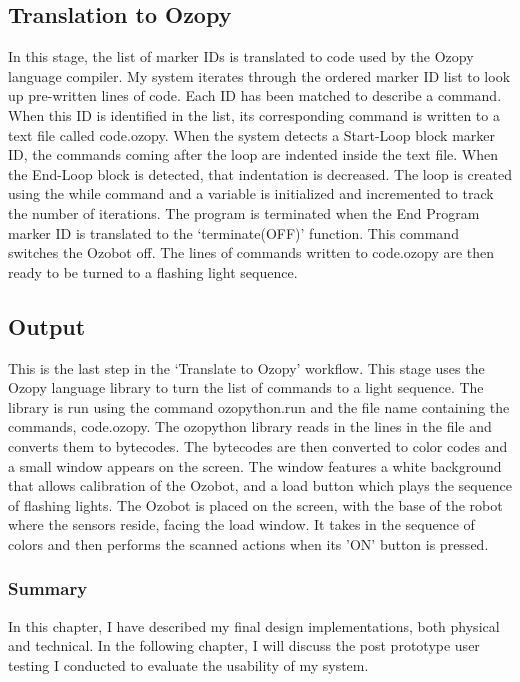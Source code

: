 \documentclass[oneside,%
                    author={Malak Hajji},
                    degree={BSc},
                    title={Designing An Accessible Ozobot Programming Platform for Students},
                  subtitle={With Mixed Visual Abilities}]{dissertation}
\begin{document}
 
\subsection{Translation to Ozopy}
 
In this stage, the list of marker IDs is translated to code used by the Ozopy language compiler. My system iterates through the ordered marker ID list to look up pre-written lines of code. Each ID has been matched to describe a command. When this ID is identified in the list, its corresponding command is written to a text file called code.ozopy.  
When the system detects a Start-Loop block marker ID, the commands coming after the loop are indented inside the text file. When the End-Loop block is detected, that indentation is decreased. The loop is created using the while command and a variable is initialized and incremented to track the number of iterations. The program is terminated when the End Program marker ID is translated to the ‘terminate(OFF)’ function. This command switches the Ozobot off. 
The lines of commands written to code.ozopy are then ready to be turned to a flashing light sequence. 
 
\subsection{Output}  
This is the last step in the ‘Translate to Ozopy’ workflow. This stage uses the Ozopy language library to turn the list of commands to a light sequence. The library is run using the command ozopython.run and the file name containing the commands, code.ozopy. The ozopython library reads in the lines in the file and converts them to bytecodes. The bytecodes are then converted to color codes and a small window appears on the screen. The window features a white background that allows calibration of the Ozobot, and a load button which plays the sequence of flashing lights. The Ozobot is placed on the screen, with the base of the robot where the sensors reside, facing the load window. It takes in the sequence of colors and then performs the scanned actions when its 'ON' button is pressed.

\subsubsection{Summary}
In this chapter, I have described my final design implementations, both physical and technical. In the following chapter, I will discuss the post prototype user testing I conducted to evaluate the usability of my system.
\end{document}

